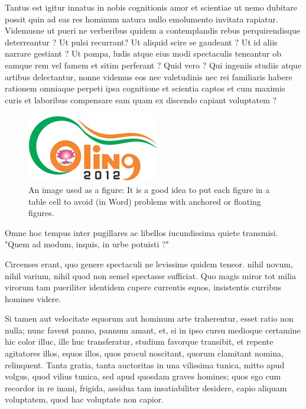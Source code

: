 \documentclass[10pt,a5paper,twoside]{article}
\begin{document}
Tantus est igitur innatus in nobis cognitionis amor et scientiae ut nemo dubitare possit quin ad eas res hominum natura nullo emolumento invitata rapiatur. Videmusne ut pueri ne verberibus quidem a contemplandis rebus perquirendisque deterreantur ? Ut pulsi recurrant? Ut aliquid scire se gaudeant ? Ut id aliis narrare gestiant ? Ut pompa, ludis atque eius modi spectaculis teneantur ob eamque rem vel famem et sitim perferant ? Quid vero ? Qui ingeniis studiis atque artibus delectantur, nonne videmus eos nec valetudinis nec rei familiaris habere rationem omniaque perpeti ipsa cognitione et scientia captos et cum maximis curis et laboribus compensare eam quam ex discendo capiant voluptatem ?
\newpage
\begin{figure}[htbp] 
\begin{center}
\includegraphics[scale=0.70]{coling_logo.jpg}
\caption{An image used as a figure: It is a good idea to put each figure in a table cell to avoid (in Word) problems with anchored or floating figures.}
\label{image} %
\end{center} 
\end{figure} %
Omne hoc tempus inter pugillares ac libellos iucundissima quiete transmisi. "Quem ad modum, inquis, in urbe potuisti ?"

Circenses erant, quo genere spectaculi ne levissime quidem teneor. nihil novum, nihil varium, nihil quod non semel spectasse sufficiat. Quo magis miror tot milia virorum tam pueriliter identidem cupere currentis equos, insistentis curribus homines videre.

Si tamen aut velocitate equorum aut hominum arte traherentur, esset ratio non nulla; nunc favent panno, pannum amant, et, si in ipso cursu medioque certamine hic color illuc, ille huc transferatur, studium favorque transibit, et repente agitatores illos, equos illos, quos procul noscitant, quorum clamitant nomina, relinquent. Tanta gratia, tanta auctoritas in una vilissima tunica, mitto apud volgus, quod vilius tunica, sed apud quosdam graves homines; quos ego cum recordor in re inani, frigida, assidua tam insatiabiliter desidere, capio aliquam voluptatem, quod hac voluptate non capior.
\end{document}
